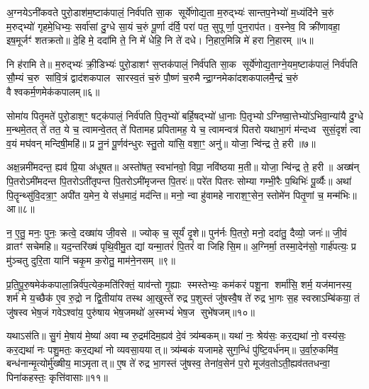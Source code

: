 {\anuvakamend[{व॒यं यद् विꣳ॑श॒तिश्च॑॥३॥}]}

अ॒ग्नयेऽनी॑कवते पुरो॒डाश॑म॒ष्टाक॑पालं॒ निर्व॑पति सा॒क सूर्ये॑णोद्य॒ता म॒रुद्भ्यः॑ सान्तप॒नेभ्यो॑ म॒ध्यंदि॑ने च॒रुं म॒रुद्भ्यो॑ गृहमे॒धिभ्यः॒ सर्वा॑सां दु॒ग्धे सा॒यं च॒रुं पू॒र्णा द॑र्वि॒ परा॑ पत॒ सुपूर्णा॒ पुन॒राप॑त। व॒स्नेव॒ वि क्री॑णावहा॒ इष॒मूर्जꣳ॑ शतक्रतो॥ दे॒हि मे॒ ददा॑मि ते॒ नि मे॑ धेहि॒ नि ते॑ दधे। नि॒हार॒मिन्नि मे॑ हरा नि॒हारम्॥५॥

नि ह॑रामि ते॥ म॒रुद्भ्यः॑ क्री॒डिभ्यः॑ पुरो॒डाशꣳ॑ स॒प्तक॑पालं॒ निर्व॑पति सा॒क सूर्ये॑णोद्य॒ताग्ने॒यम॒ष्टाक॑पालं॒ निर्व॑पति सौ॒म्यं च॒रु सा॑वि॒त्रं द्वाद॑शकपाल सारस्व॒तं च॒रुं पौ॒ष्णं च॒रुमैन्द्रा॒ग्नमेका॑दशकपालमै॒न्द्रं च॒रुं वैश्वकर्म॒णमेक॑कपालम्॥६॥

{\anuvakamend[{ह॒रा॒ नि॒हारं॑ त्रि॒ꣳ॒शच्च॑॥४॥}]}

सोमा॑य पितृ॒मते॑ पुरो॒डाश॒ꣳ॒ षट्क॑पालं॒ निर्व॑पति पि॒तृभ्यो॑ बर्\mbox{}हि॒षद्भ्यो॑ धा॒नाः पि॒तृभ्योऽग्निष्वा॒त्तेभ्यो॑ऽभिवा॒न्या॑यै दु॒ग्धे म॒न्थमे॒तत् ते॑ तत॒ ये च॒ त्वामन्वे॒तत् ते॑ पितामह प्रपितामह॒ ये च॒ त्वामन्वत्र॑ पितरो यथाभा॒गं म॑न्दध्व सुसं॒दृशं॑ त्वा व॒यं मघ॑वन् मन्दिषी॒महि॑॥ प्र नू॒नं पू॒र्णव॑न्धुरः स्तु॒तो या॑सि॒ वशा॒ꣳ॒ अनु॑॥ योजा॒ न्वि॑न्द्र ते॒ हरी॥७॥

अक्ष॒न्नमी॑मदन्त॒ ह्यव॑ प्रि॒या अ॑धूषत॥ अस्तो॑षत॒ स्वभा॑नवो॒ विप्रा॒ नवि॑ष्ठया म॒ती॥ योजा॒ न्वि॑न्द्र ते॒ हरी॥ अख्ष॑न् पि॒तरोऽमी॑मदन्त पि॒तरोऽती॑तृपन्त पि॒तरोऽमी॑मृजन्त पि॒तरः॑॥ परे॑त पितरः सोम्या गम्भी॒रैः प॒थिभिः॑ पू॒र्व्यैः॥ अथा॑ पि॒तॄन्थ्सु॑वि॒दत्रा॒ꣳ॒ अपी॑त य॒मेन॒ ये स॑ध॒मादं॒ मद॑न्ति॥ मनो॒ न्वा हु॑वामहे नाराश॒ꣳ॒सेन॒ स्तोमे॑न पितृ॒णां च॒ मन्म॑भिः॥ आ॥८॥

न॒ ए॒तु॒ मनः॒ पुनः॒ क्रत्वे॒ दख्षा॑य जी॒वसे॥ ज्योक् च॒ सूर्यं॑ दृ॒शे॥ पुन॑र्नः पि॒तरो॒ मनो॒ ददा॑तु॒ दैव्यो॒ जनः॑॥ जी॒वं व्रातꣳ॑ सचेमहि॥ यद॒न्तरि॑ख्षं पृथि॒वीमु॒त द्यां यन्मा॒तरं॑ पि॒तरं॑ वा जिहिसि॒म॥ अ॒ग्निर्मा॒ तस्मा॒देन॑सो॒ गार्\mbox{}ह॑पत्यः॒ प्र मु॑ञ्चतु दुरि॒ता यानि॑ चकृ॒म क॒रोतु॒ माम॑ने॒नसम्॥९॥

{\anuvakamend[{हरी॒ मन्म॑भि॒रा चतु॑श्चत्वारिशच्च॥५॥}]}

प्र॒ति॒पू॒रु॒षमेक॑कपाला॒न्निर्व॑प॒त्येक॒मति॑रिक्तं॒ याव॑न्तो गृ॒ह्याः स्मस्तेभ्यः॒ कम॑करं पशू॒ना शर्मा॑सि॒ शर्म॒ यज॑मानस्य॒ शर्म॑ मे य॒च्छैक॑ ए॒व रु॒द्रो न द्वि॒तीया॑य तस्थ आ॒खुस्ते॑ रुद्र प॒शुस्तं जु॑षस्वै॒ष ते॑ रुद्र भा॒गः स॒ह स्वस्राऽम्बि॑कया॒ तं जु॑षस्व भेष॒जं गवेऽश्वा॑य॒ पुरु॑षाय भेष॒जमथो॑ अ॒स्मभ्यं॑ भेष॒ज सुभे॑षजम्॥१०॥

यथाऽस॑ति॥ सु॒गं मे॒षाय॑ मे॒ष्या॑ अवाम्ब रु॒द्रम॑दिम॒ह्यव॑ दे॒वं त्र्य॑म्बकम्॥ यथा॑ नः॒ श्रेय॑सः॒ कर॒द्यथा॑ नो॒ वस्य॑सः॒ कर॒द्यथा॑ नः पशु॒मतः॒ कर॒द्यथा॑ नो व्यवसा॒ययात्॥ त्र्य॑म्बकं यजामहे सुग॒न्धिं पु॑ष्टि॒वर्ध॑नम्॥ उ॒र्वा॒रु॒कमि॑व॒ बन्ध॑नान्मृ॒त्योर्मु॑ख्षीय॒ माऽमृतात्॥ ए॒ष ते॑ रुद्र भा॒गस्तं जु॑षस्व॒ तेना॑व॒सेन॑ प॒रो मूज॑व॒तोऽती॒ह्यव॑ततधन्वा॒ पिना॑कहस्तः॒ कृत्ति॑वासाः॥११॥

